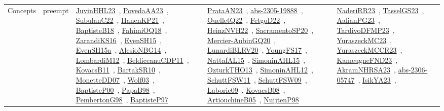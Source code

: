 {\begin{longtable}{lp{3cm}>{\raggedright\arraybackslash}p{6cm}>{\raggedright\arraybackslash}p{6cm}>{\raggedright\arraybackslash}p{8cm}}
Concepts & preempt & \href{papers/JuvinHHL23.pdf}{JuvinHHL23}~\cite{JuvinHHL23}, \href{papers/PovedaAA23.pdf}{PovedaAA23}~\cite{PovedaAA23}, \href{articles/SubulanC22.pdf}{SubulanC22}~\cite{SubulanC22}, \href{papers/HanenKP21.pdf}{HanenKP21}~\cite{HanenKP21}, \href{articles/BaptisteB18.pdf}{BaptisteB18}~\cite{BaptisteB18}, \href{articles/FahimiOQ18.pdf}{FahimiOQ18}~\cite{FahimiOQ18}, \href{articles/ZarandiKS16.pdf}{ZarandiKS16}~\cite{ZarandiKS16}, \href{papers/EvenSH15.pdf}{EvenSH15}~\cite{EvenSH15}, \href{articles/EvenSH15a.pdf}{EvenSH15a}~\cite{EvenSH15a}, \href{papers/AlesioNBG14.pdf}{AlesioNBG14}~\cite{AlesioNBG14}, \href{articles/LombardiM12.pdf}{LombardiM12}~\cite{LombardiM12}, \href{articles/BeldiceanuCDP11.pdf}{BeldiceanuCDP11}~\cite{BeldiceanuCDP11}, \href{articles/KovacsB11.pdf}{KovacsB11}~\cite{KovacsB11}, \href{articles/BartakSR10.pdf}{BartakSR10}~\cite{BartakSR10}, \href{papers/MonetteDD07.pdf}{MonetteDD07}~\cite{MonetteDD07}, \href{papers/Wolf03.pdf}{Wolf03}~\cite{Wolf03}, \href{articles/BaptisteP00.pdf}{BaptisteP00}~\cite{BaptisteP00}, \href{articles/PapaB98.pdf}{PapaB98}~\cite{PapaB98}, \href{papers/PembertonG98.pdf}{PembertonG98}~\cite{PembertonG98}, \href{papers/BaptisteP97.pdf}{BaptisteP97}~\cite{BaptisteP97} & \href{articles/PrataAN23.pdf}{PrataAN23}~\cite{PrataAN23}, \href{articles/abs-2305-19888.pdf}{abs-2305-19888}~\cite{abs-2305-19888}, \href{papers/OuelletQ22.pdf}{OuelletQ22}~\cite{OuelletQ22}, \href{articles/FetgoD22.pdf}{FetgoD22}~\cite{FetgoD22}, \href{articles/HeinzNVH22.pdf}{HeinzNVH22}~\cite{HeinzNVH22}, \href{articles/SacramentoSP20.pdf}{SacramentoSP20}~\cite{SacramentoSP20}, \href{papers/Mercier-AubinGQ20.pdf}{Mercier-AubinGQ20}~\cite{Mercier-AubinGQ20}, \href{articles/LunardiBLRV20.pdf}{LunardiBLRV20}~\cite{LunardiBLRV20}, \href{papers/YoungFS17.pdf}{YoungFS17}~\cite{YoungFS17}, \href{articles/NattafAL15.pdf}{NattafAL15}~\cite{NattafAL15}, \href{articles/SimoninAHL15.pdf}{SimoninAHL15}~\cite{SimoninAHL15}, \href{articles/OzturkTHO13.pdf}{OzturkTHO13}~\cite{OzturkTHO13}, \href{papers/SimoninAHL12.pdf}{SimoninAHL12}~\cite{SimoninAHL12}, \href{articles/SchuttFSW11.pdf}{SchuttFSW11}~\cite{SchuttFSW11}, \href{papers/SchuttFSW09.pdf}{SchuttFSW09}~\cite{SchuttFSW09}, \href{papers/Laborie09.pdf}{Laborie09}~\cite{Laborie09}, \href{articles/KovacsB08.pdf}{KovacsB08}~\cite{KovacsB08}, \href{papers/ArtiouchineB05.pdf}{ArtiouchineB05}~\cite{ArtiouchineB05}, \href{articles/NuijtenP98.pdf}{NuijtenP98}~\cite{NuijtenP98} & \href{articles/NaderiRR23.pdf}{NaderiRR23}~\cite{NaderiRR23}, \href{papers/TasselGS23.pdf}{TasselGS23}~\cite{TasselGS23}, \href{papers/AalianPG23.pdf}{AalianPG23}~\cite{AalianPG23}, \href{papers/TardivoDFMP23.pdf}{TardivoDFMP23}~\cite{TardivoDFMP23}, \href{papers/YuraszeckMC23.pdf}{YuraszeckMC23}~\cite{YuraszeckMC23}, \href{articles/YuraszeckMCCR23.pdf}{YuraszeckMCCR23}~\cite{YuraszeckMCCR23}, \href{papers/KameugneFND23.pdf}{KameugneFND23}~\cite{KameugneFND23}, \href{articles/AkramNHRSA23.pdf}{AkramNHRSA23}~\cite{AkramNHRSA23}, \href{articles/abs-2306-05747.pdf}{abs-2306-05747}~\cite{abs-2306-05747}, \href{articles/IsikYA23.pdf}{IsikYA23}~\cite{IsikYA23}, 
\end{longtable}}
